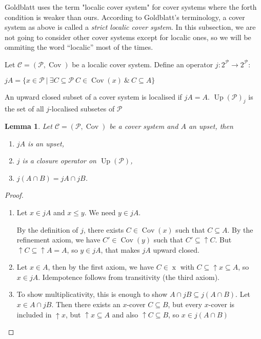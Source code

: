 \documentclass[a4paper]{article}
\theoremstyle{defin}
\theoremstyle{theorem}
\theoremstyle{claim}
\theoremstyle{prop}
\theoremstyle{lemma}
\newtheorem{lemma}{Lemma}
\theoremstyle{fact}
\theoremstyle{ex}
\theoremstyle{col}
\begin{document}
Goldblatt uses the term "localic cover system" for cover systems where the forth condition is weaker than ours. According to Goldblatt's terminology, a cover system as above is called a \emph{strict localic cover system}. In this subsection, we are not going to consider other cover systems except for localic ones, so we will be ommiting the word ``localic'' most of the times.

Let $\mathcal{C} = (\mathcal{P}, \operatorname{Cov})$ be a localic cover system. Define an operator $j : 2^\mathcal{P}
\to 2^\mathcal{P}$:
\begin{center}
$j A = \{ x \in \mathcal{P} \: | \: \exists C \subseteq \mathcal{P} \: C \in \operatorname{Cov}(x) \: \& \: C \subseteq A\}$
\end{center}

An upward closed subset of a cover system is localised if $j A = A$. $\operatorname{Up}(\mathcal{P})_j$ is the set of all $j$-localised subsetes of $\mathcal{P}$

\begin{lemma} Let $\mathcal{C} = (\mathcal{P}, \operatorname{Cov})$ be a cover system and $A$ an upset, then

\begin{enumerate}
\item $j A$ is an upset,
\item $j$ is a closure operator on $\operatorname{Up}(\mathcal{P})$,
\item $j (A \cap B) = j A \cap j B$.
\end{enumerate}

\end{lemma}

\begin{proof}
$ $
\begin{enumerate}
\item Let $x \in j A$ and $x \leq y$. We need $y \in j A$.

By the definition of $j$, there exists $C \in \operatorname{Cov}(x)$ such that $C \subseteq A$.
By the refinement axiom, we have $C' \in \operatorname{Cov}(y)$ such that $C' \subseteq \uparrow C$.
But $\uparrow C \subseteq \uparrow A = A$, so $y \in j A$, that makes $j A$ upward closed.
\item Let $x \in A$, then by the first axiom, we have $C \in \operatorname{x}$ with $C \subseteq \uparrow x \subseteq A$, so $x \in j A$. Idempotence follows from transitivity (the third axiom).

\item To show multiplicativity, this is enough to show $A \cap j B \subseteq j (A \cap B)$.
Let $x \in A \cap j B$. Then there exists an $x$-cover $C \subseteq B$, but every $x$-cover is included in $\uparrow x$, but $\uparrow x \subseteq A$ and also $\uparrow C \subseteq B$, so $x \in j (A \cap B)$
\end{enumerate}
\end{proof}
\end{document}
